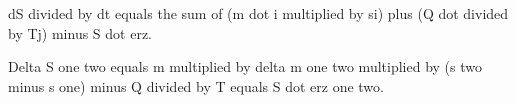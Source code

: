 dS divided by dt equals the sum of (m dot i multiplied by si) plus (Q dot divided by Tj) minus S dot erz.  

Delta S one two equals m multiplied by delta m one two multiplied by (s two minus s one) minus Q divided by T equals S dot erz one two.